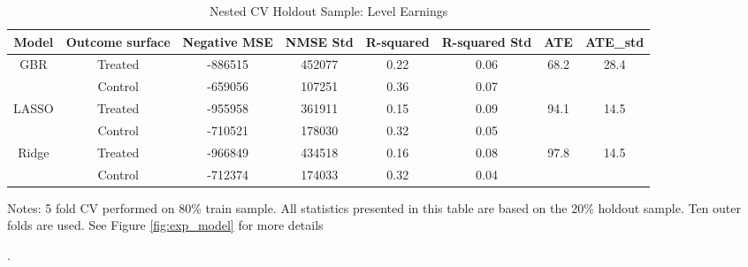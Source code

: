 \documentclass[12pt, a4paper]{article}
\begin{document}
\begin{landscape}
\clearpage
\begin{table}[htbp]
\centering
\small
\caption{Nested CV Holdout Sample: Level Earnings}
\begin{tabular}{cccccccc}
\toprule
Model   &  Outcome surface  &  Negative MSE  &  NMSE Std  &  R-squared  &  R-squared Std  & ATE   & ATE\_std   \\
\midrule                         
\multirow{2}{*}{\hfil GBR}  &  Treated  &  -886515  &  452077 &  0.22  &  0.06  &  \multirow{2}{*}{\hfil 68.2}  &  \multirow{2}{*}{\hfil  28.4 }	 \\
&  Control  &  -659056  &  107251	 &  0.36 & 0.07  & & \\
\midrule																						
\multirow{2}{*}{\hfil LASSO} & Treated & -955958	 & 361911	 & 0.15	 & 0.09	 & \multirow{2}{*}{\hfil 94.1}	 & \multirow{2}{*}{\hfil 14.5}	 \\
& Control	 & -710521 & 	178030	 & 0.32	 & 0.05	 & & \\
\midrule  																								
\multirow{2}{*}{\hfil Ridge}	 & Treated	 & -966849	& 434518	 & 0.16	 & 0.08	 &  \multirow{2}{*}{\hfil  97.8}  &  \multirow{2}{*}{\hfil 14.5}	 \\
&  Control  &  -712374  &  174033  &  0.32  &  0.04  & & \\
\bottomrule
\end{tabular}
\par\medskip
\parbox{1.1\textwidth}{\footnotesize Notes: 5 fold CV performed on 80\% train sample. All statistics presented in this table are based on the 20\% holdout sample. Ten outer folds are used. See Figure \ref{fig:exp_model} for more details}. \\
\label{tab:ncvhos}
\end{table}


\end{landscape}
\end{document}
